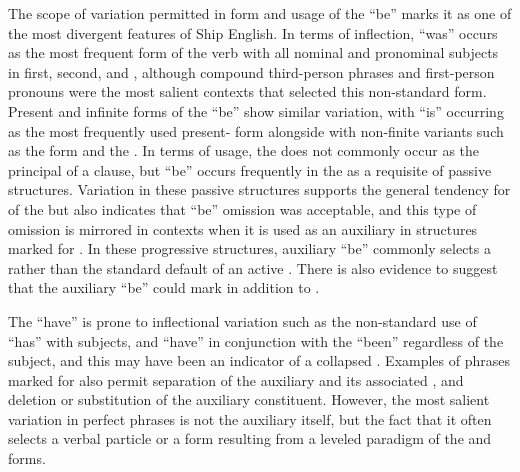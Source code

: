 The scope of variation permitted in form and usage of the  “be” marks it as one of the most divergent features of Ship English. In terms of inflection, “was” occurs as the most frequent  form of the verb with all nominal and pronominal subjects in first, second, and , although compound third-person  phrases and  first-person pronouns were the most salient contexts that selected this non-standard  form. Present  and infinite forms of the  “be” show similar variation, with “is” occurring as the most frequently used present- form alongside  with non-finite variants such as the  form and the . In terms of usage, the  does not commonly occur as the principal  of a clause, but “be” occurs frequently in the  as a requisite of passive structures. Variation in these passive structures supports the general tendency for  of the  but also indicates that “be” omission was acceptable, and this type of omission is mirrored in contexts when it is used as an auxiliary in structures marked for .  In these progressive structures, auxiliary “be” commonly selects a   rather than the standard default of an active . There is also evidence to suggest that the auxiliary “be” could mark  in addition to . 

The  “have” is prone to inflectional variation such as the non-standard use of “has” with   subjects, and  “have” in conjunction with the  “been” regardless of the subject, and this may have been an indicator of a collapsed . Examples of  phrases marked for  also permit separation of the auxiliary and its associated , and deletion or substitution of the auxiliary constituent. However, the most salient variation in perfect  phrases is not the auxiliary itself, but the fact that it often selects a  verbal particle or a form resulting from a leveled paradigm of the  and  forms. 


